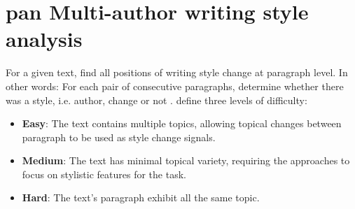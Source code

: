 \section{\acs{pan} Multi-author writing style analysis}
\label{sec:pan_multi_author_writing_style_analysis}

For a given text, find all positions of writing style change at paragraph level.
In other words: For each pair of consecutive paragraphs, 
determine whether there was a style, i.e. author, change or not \citep{zangerle_overview_2024,ayele_overview_2024}.
\citet{zangerle_overview_2024} define three levels of difficulty:
\begin{itemize}
    \item \textbf{Easy}: The text contains multiple topics, 
    allowing topical changes between paragraph to be used as style change signals.
    \item \textbf{Medium}: The text has minimal topical variety, 
    requiring the approaches to focus on stylistic features for the task.
    \item \textbf{Hard}: The text's paragraph exhibit all the same topic.
\end{itemize}